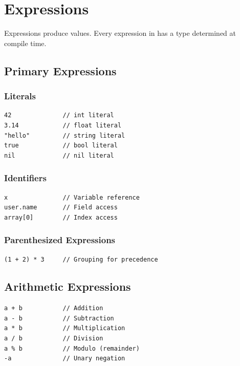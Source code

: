 \chapter{Expressions}
\label{ch:expressions}

Expressions produce values. Every expression in \haira{} has a type determined at compile time.

\section{Primary Expressions}

\subsection{Literals}

\begin{lstlisting}
42              // int literal
3.14            // float literal
"hello"         // string literal
true            // bool literal
nil             // nil literal
\end{lstlisting}

\subsection{Identifiers}

\begin{lstlisting}
x               // Variable reference
user.name       // Field access
array[0]        // Index access
\end{lstlisting}

\subsection{Parenthesized Expressions}

\begin{lstlisting}
(1 + 2) * 3     // Grouping for precedence
\end{lstlisting}

\section{Arithmetic Expressions}

\begin{lstlisting}
a + b           // Addition
a - b           // Subtraction
a * b           // Multiplication
a / b           // Division
a % b           // Modulo (remainder)
-a              // Unary negation
\end{lstlisting}

